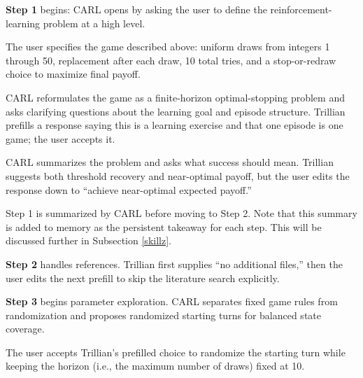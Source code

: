 \documentclass[mnsc,sglanonrev]{informs4}
\begin{document}
\begin{description}[leftmargin=1.0in,style=nextline]

\item[\href{https://youtu.be/Qx673uczp4c?t=0}{\texttt{00:00}}]
{\bf Step 1} begins: CARL opens by asking the user to define the reinforcement-learning problem at a high level.

\item[\href{https://youtu.be/Qx673uczp4c?t=10}{\texttt{00:10}}]
The user specifies the game described above: uniform draws from integers 1 through 50, replacement after each draw, 10 total tries, and a stop-or-redraw choice to maximize final payoff.

\item[\href{https://youtu.be/Qx673uczp4c?t=20}{\texttt{00:20}}]
CARL reformulates the game as a finite-horizon optimal-stopping problem and asks clarifying questions about the learning goal and episode structure. 
Trillian prefills a response saying this is a learning exercise and that one episode is one game; the user accepts it.

\item[\href{https://youtu.be/Qx673uczp4c?t=65}{\texttt{01:05}}]
CARL summarizes the problem and asks what success should mean. Trillian suggests both threshold recovery and near-optimal payoff, but the user edits the response down to ``achieve near-optimal expected payoff.'' 

\item[\href{https://youtu.be/Qx673uczp4c?t=135}{\texttt{02:15}}]
Step 1 is summarized by CARL before moving to Step 2. Note that this summary is added to memory as the persistent takeaway for each step. This will be discussed further in Subsection \ref{skillz}.

\item[\href{https://youtu.be/Qx673uczp4c?t=140}{\texttt{02:20}}]
{\bf Step 2} handles references. Trillian first supplies ``no additional files,'' then the user edits the next prefill to skip the literature search explicitly.

\item[\href{https://youtu.be/Qx673uczp4c?t=210}{\texttt{03:30}}]
{\bf Step 3} begins parameter exploration. CARL separates fixed game rules from randomization and proposes randomized starting turns for balanced state coverage.

\item[\href{https://youtu.be/Qx673uczp4c?t=260}{\texttt{04:20}}]
The user accepts Trillian's prefilled choice to randomize the starting turn while keeping the horizon (i.e., the maximum number of draws) fixed at 10.


\end{description}
\end{document}
